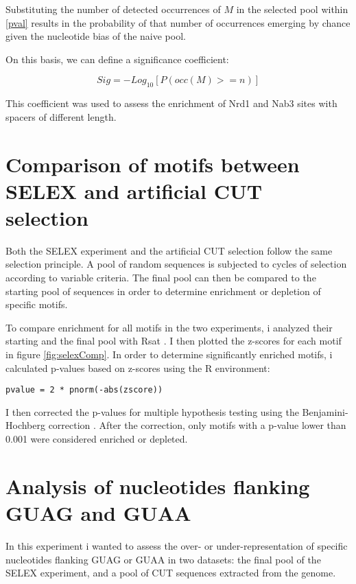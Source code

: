 Substituting the number of detected occurrences of $M$ in the selected pool  within \ref{pval} results in the probability of that number of occurrences emerging by chance given the nucleotide bias of the naive pool. 



On this basis, we can define a significance coefficient:

\begin{equation}
Sig = -Log_{10}[P(occ(M) >= n)]
\end{equation}

This coefficient was used to assess the enrichment of Nrd1 and Nab3 sites with spacers of different length.

\singlespacing
\section*{Comparison of motifs between SELEX and artificial CUT selection}
\doublespacing

Both the SELEX experiment and the artificial CUT selection follow the same selection principle. A pool of random sequences is subjected to cycles of selection according to variable criteria. The final pool can then be compared to the starting pool of sequences in order to determine enrichment or depletion of specific motifs. 

To compare enrichment for all motifs in the two experiments, i analyzed their starting and the final pool with Rsat \cite{medinarivera:2015:rsat}. I then plotted the z-scores for each motif in figure \ref{fig:selexComp}.
In order to determine significantly enriched motifs, i calculated p-values based on z-scores using the R environment:

\begin{verbatim}
pvalue = 2 * pnorm(-abs(zscore))
\end{verbatim}

I then corrected the p-values for multiple hypothesis testing using the Benjamini-Hochberg correction \cite{hochberg:1990:more}. After the correction, only motifs with a p-value lower than 0.001 were considered enriched or depleted.

\section*{Analysis of nucleotides flanking GUAG and GUAA}

In this experiment i wanted to assess the over- or under-representation of specific nucleotides flanking GUAG or GUAA in two datasets: the final pool of the SELEX experiment, and a pool of CUT sequences extracted from the genome. 

